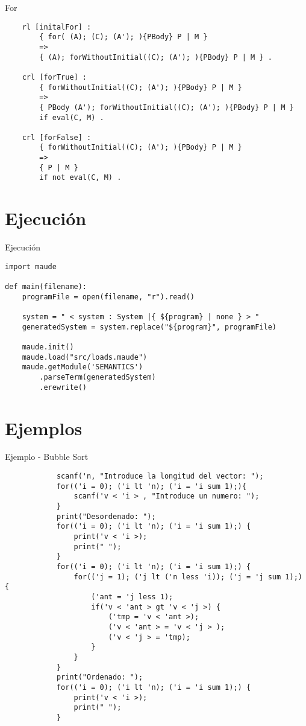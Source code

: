 \documentclass{beamer}
\begin{document}
    \begin{frame}[fragile]{For}
        \begin{verbatim}  
    rl [initalFor] :
        { for( (A); (C); (A'); ){PBody} P | M }
        =>
        { (A); forWithoutInitial((C); (A'); ){PBody} P | M } .
    
    crl [forTrue] :
        { forWithoutInitial((C); (A'); ){PBody} P | M }
        =>
        { PBody (A'); forWithoutInitial((C); (A'); ){PBody} P | M }
        if eval(C, M) .
    
    crl [forFalse] :
        { forWithoutInitial((C); (A'); ){PBody} P | M }
        =>
        { P | M }
        if not eval(C, M) .
        \end{verbatim}
    \end{frame}

    \section{Ejecución}
    \begin{frame}[fragile]{Ejecución}
        \begin{verbatim}  
import maude
     
def main(filename):
    programFile = open(filename, "r").read()
            
    system = " < system : System |{ ${program} | none } > "
    generatedSystem = system.replace("${program}", programFile)
            
    maude.init()
    maude.load("src/loads.maude")
    maude.getModule('SEMANTICS')
        .parseTerm(generatedSystem)
        .erewrite()
        \end{verbatim}
    \end{frame}
    
    \section{Ejemplos}
    \begin{frame}[fragile]{Ejemplo - Bubble Sort}
        \begin{verbatim}  
            scanf('n, "Introduce la longitud del vector: ");
            for(('i = 0); ('i lt 'n); ('i = 'i sum 1);){
                scanf('v < 'i > , "Introduce un numero: ");
            }
            print("Desordenado: ");
            for(('i = 0); ('i lt 'n); ('i = 'i sum 1);) {
                print('v < 'i >);
                print(" ");
            }
            for(('i = 0); ('i lt 'n); ('i = 'i sum 1);) {
                for(('j = 1); ('j lt ('n less 'i)); ('j = 'j sum 1);) {
                    ('ant = 'j less 1);
                    if('v < 'ant > gt 'v < 'j >) {
                        ('tmp = 'v < 'ant >);
                        ('v < 'ant > = 'v < 'j > );
                        ('v < 'j > = 'tmp);
                    }
                }
            }
            print("Ordenado: ");
            for(('i = 0); ('i lt 'n); ('i = 'i sum 1);) {
                print('v < 'i >);
                print(" ");
            }
        \end{verbatim}
    \end{frame}
\end{document}
